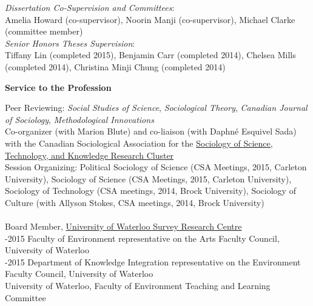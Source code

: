 \documentclass[9pt,usenames,dvipsnames]{article}
\begin{document}

\noindent \emph{Dissertation Co-Supervision and Committees}:  \\
\noindent Amelia Howard (co-supervisor), Noorin Manji (co-supervisor), Michael Clarke (committee member) \\

\noindent \emph{Senior Honors Theses Supervision}: \\
\noindent Tiffany Lin (completed 2015), Benjamin Carr (completed 2014), Chelsea Mills (completed 2014), Christina Minji Chung (completed 2014) \\


\ind \textbf{Service to the Profession}

\noindent Peer Reviewing: {\it Social Studies of Science}, {\it Sociological Theory}, {\it Canadian Journal of Sociology}, {\it Methodological Innovations}\\

\noindent Co-organizer (with Marion Blute) and co-liaison (with Daphné Esquivel Sada) with the Canadian Sociological Association for the \href{http://www.csa-scs.ca/files/webapps/csapress/sstk/}{Sociology of Science, Technology, and Knowledge Research Cluster}\\

\noindent Session Organizing: Political Sociology of Science (CSA Meetings, 2015, Carleton University), Sociology of Science (CSA Meetings, 2015, Carleton University), Sociology of Technology (CSA meetings, 2014, Brock University), Sociology of Culture (with Allyson Stokes, CSA meetings, 2014, Brock University) \\

 \\
 Board Member, \href{http://math.uwaterloo.ca/survey-research-centre/node/1}{University of Waterloo Survey Research Centre}  \\

-2015 Faculty of Environment representative on the Arts Faculty Council, University of Waterloo \\

-2015 Department of Knowledge Integration representative on the Environment Faculty Council, University of Waterloo \\

 University of Waterloo, Faculty of Environment Teaching and Learning Committee \\
\end{document}
